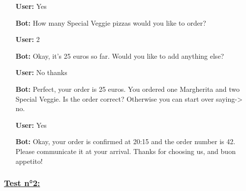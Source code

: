 \begin{itemize}
\item[\textbf{User:}] Yes

\item[\textbf{Bot:}]How many Special Veggie pizzas would you like to order?

\item[\textbf{User:}] 2

\item[\textbf{Bot:}] Okay, it’s 25 euros so far. Would you like to add anything else?

\item[\textbf{User:}] No thanks

\item[\textbf{Bot:}] Perfect, your order is 25 euros. You ordered one Margherita and two Special Veggie. Is the order correct? Otherwise you can start over saying-> no.

\item[\textbf{User:}] Yes

\item[\textbf{Bot:}] Okay, your order is confirmed at 20:15 and the order number is 42. Please communicate it at your arrival. Thanks for choosing us, and buon appetito!


\end{itemize}


\vspace{0.5cm}
\subsubsection*{\underline{Test n°2:} }

